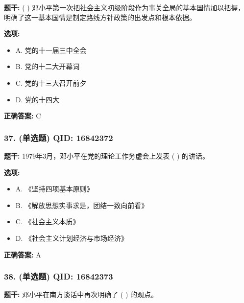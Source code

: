 \documentclass[12pt,UTF8]{ctexart}
\begin{document}
\textbf{题干:}
( ) 邓小平第一次把社会主义初级阶段作为事关全局的基本国情加以把握，明确了这一基本国情是制定路线方针政策的出发点和根本依据。

\textbf{选项:}
\begin{itemize}[leftmargin=*]

  \item A. 党的十一届三中全会

  \item B. 党的十二大开幕词

  \item C. 党的十三大召开前夕

  \item D. 党的十四大

\end{itemize}

\textbf{正确答案:}
C

\vspace{0.3em}\hrulefill\vspace{0.7em}

\subsubsection*{37. (单选题) \small QID: 16842372}

\textbf{题干:}
1979年3月，邓小平在党的理论工作务虚会上发表 ( ) 的讲话。

\textbf{选项:}
\begin{itemize}[leftmargin=*]

  \item A. 《坚持四项基本原则》

  \item B. 《解放思想实事求是，团结一致向前看》

  \item C. 《社会主义本质》

  \item D. 《社会主义计划经济与市场经济》

\end{itemize}

\textbf{正确答案:}
A

\vspace{0.3em}\hrulefill\vspace{0.7em}

\subsubsection*{38. (单选题) \small QID: 16842373}

\textbf{题干:}
邓小平在南方谈话中再次明确了 ( ) 的观点。
\end{document}
